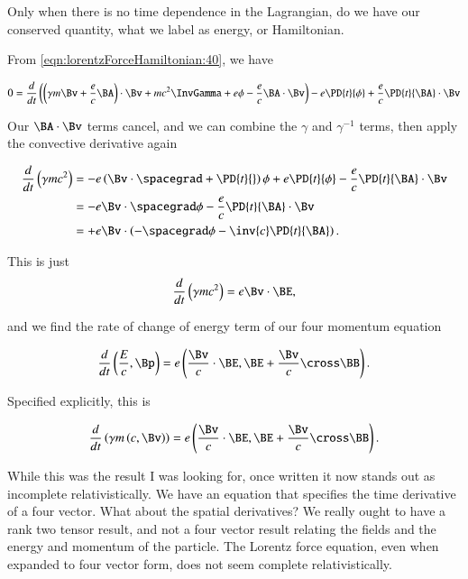 Only when there is no time dependence in the Lagrangian, do we have our conserved quantity, what we label as energy, or Hamiltonian.

From \ref{eqn:lorentzForceHamiltonian:40}, we have

\begin{align*}
0 &= 
\frac{d}{dt} \left( 
\left( \gamma m \Bv + \frac{e}{c} \BA \right) \cdot \Bv 
+m c^2 \InvGamma + e \phi - \frac{e}{c} \BA \cdot \Bv
\right) 
- e \PD{t}{\phi} + \frac{e}{c} \PD{t}{\BA} \cdot \Bv \\
\end{align*}

Our $\BA \cdot \Bv$ terms cancel, and we can combine the $\gamma$ and $\gamma^{-1}$ terms, then apply the convective derivative again

\begin{align*}
\frac{d}{dt} \left( 
\gamma m c^2 
\right) 
&= 
- e \left( \Bv \cdot \spacegrad + \PD{t}{} \right) \phi 
+ e \PD{t}{\phi} - \frac{e}{c} \PD{t}{\BA} \cdot \Bv \\
&= 
- e \Bv \cdot \spacegrad \phi 
- \frac{e}{c} \PD{t}{\BA} \cdot \Bv \\
&= 
+ e \Bv \cdot \left( - \spacegrad \phi - \inv{c} \PD{t}{\BA} \right).
\end{align*}

This is just
\begin{equation}\label{eqn:lorentzForceHamiltonian:200}
\frac{d}{dt} \left( 
\gamma m c^2 
\right) 
= e \Bv \cdot \BE,
\end{equation}

and we find the rate of change of energy term of our four momentum equation

\begin{equation}\label{eqn:lorentzForceHamiltonian:220}
\frac{d}{dt}
\left( 
\frac{E}{c}, \Bp
\right) 
= e \left( \frac{\Bv}{c} \cdot \BE, \BE + \frac{\Bv}{c} \cross \BB \right).
\end{equation}

Specified explicitly, this is

\begin{equation}\label{eqn:lorentzForceHamiltonian:220b}
\frac{d}{dt}
\left( \gamma m \left( c, \Bv \right) \right)
= e \left( \frac{\Bv}{c} \cdot \BE, \BE + \frac{\Bv}{c} \cross \BB \right).
\end{equation}

While this was the result I was looking for, once written it now stands out as incomplete relativistically.  We have an equation that specifies the time derivative of a four vector.  What about the spatial derivatives?  We really ought to have a rank two tensor result, and not a four vector result relating the fields and the energy and momentum of the particle.  The Lorentz force equation, even when expanded to four vector form, does not seem complete relativistically.

